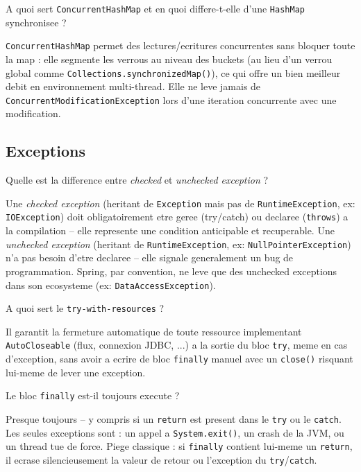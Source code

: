 \documentclass[11pt,a4paper]{article}
\begin{document}
\begin{question} A quoi sert \texttt{ConcurrentHashMap} et en quoi differe-t-elle d'une \texttt{HashMap} synchronisee ?
\end{question}
\begin{reponse}
\texttt{ConcurrentHashMap} permet des lectures/ecritures concurrentes sans bloquer toute la map : elle segmente les verrous au niveau des buckets (au lieu d'un verrou global comme \texttt{Collections.synchronizedMap()}), ce qui offre un bien meilleur debit en environnement multi-thread. Elle ne leve jamais de \texttt{ConcurrentModificationException} lors d'une iteration concurrente avec une modification.
\end{reponse}

\subsection{Exceptions}

\begin{question} Quelle est la difference entre \emph{checked} et \emph{unchecked exception} ?
\end{question}
\begin{reponse}
Une \emph{checked exception} (heritant de \texttt{Exception} mais pas de \texttt{RuntimeException}, ex: \texttt{IOException}) doit obligatoirement etre geree (try/catch) ou declaree (\texttt{throws}) a la compilation -- elle represente une condition anticipable et recuperable. Une \emph{unchecked exception} (heritant de \texttt{RuntimeException}, ex: \texttt{NullPointerException}) n'a pas besoin d'etre declaree -- elle signale generalement un bug de programmation. Spring, par convention, ne leve que des unchecked exceptions dans son ecosysteme (ex: \texttt{DataAccessException}).
\end{reponse}

\begin{question} A quoi sert le \texttt{try-with-resources} ?
\end{question}
\begin{reponse}
Il garantit la fermeture automatique de toute ressource implementant \texttt{AutoCloseable} (flux, connexion JDBC, ...) a la sortie du bloc \texttt{try}, meme en cas d'exception, sans avoir a ecrire de bloc \texttt{finally} manuel avec un \texttt{close()} risquant lui-meme de lever une exception.
\end{reponse}

\begin{question} Le bloc \texttt{finally} est-il toujours execute ?
\end{question}
\begin{reponse}
Presque toujours -- y compris si un \texttt{return} est present dans le \texttt{try} ou le \texttt{catch}. Les seules exceptions sont : un appel a \texttt{System.exit()}, un crash de la JVM, ou un thread tue de force. Piege classique : si \texttt{finally} contient lui-meme un \texttt{return}, il ecrase silencieusement la valeur de retour ou l'exception du \texttt{try}/\texttt{catch}.
\end{reponse}
\end{document}
